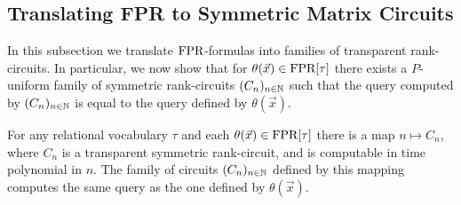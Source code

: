 \documentclass[../paper.tex]{subfiles}
\begin{document}
\subsection{Translating FPR to Symmetric Matrix Circuits}
In this subsection we translate $\text{\upshape FPR}$-formulas into families of transparent
rank-circuits. In particular, we now show that for $\theta(\vec{x}) \in
\text{\upshape FPR}[\tau]$ there exists a $P$-uniform family of symmetric rank-circuits
$(C_n)_{n \in \mathbb{N}}$ such that the query computed by $(C_n)_{n \in \mathbb{N}}$ is
equal to the query defined by $\theta (\vec{x})$.

\begin{thm}
  For any relational vocabulary $\tau$ and each $\theta(\vec{x}) \in \text{\upshape FPR}[\tau]$
  there is a map $n \mapsto C_n$, where $C_n$ is a transparent symmetric
  rank-circuit, and is computable in time polynomial in $n$. The family of
  circuits $(C_n)_{n \in \mathbb{N}}$ defined by this mapping computes the same query
  as the one defined by $\theta(\vec{x})$.
  \label{thm:translating-formulas-to-circuits}
\end{thm}
\end{document}
